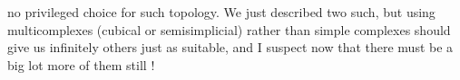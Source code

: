 no privileged choice for such topology.  We just described two such,
but using  multicomplexes (cubical or semisimplicial) rather than
simple complexes should give us infinitely  others  just as suitable,
and I suspect  now that there must be a big lot more of them still !


